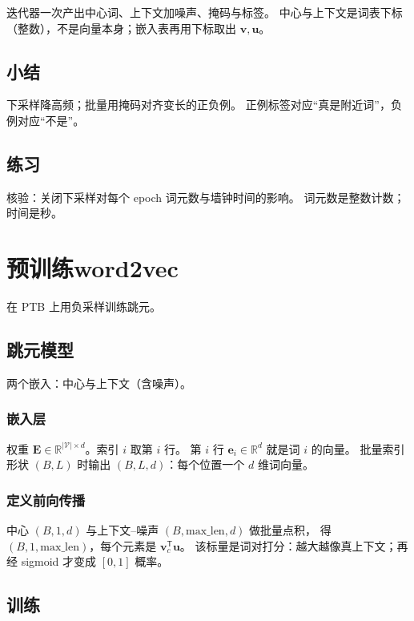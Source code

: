 迭代器一次产出中心词、上下文加噪声、掩码与标签。
中心与上下文是词表下标（整数），不是向量本身；嵌入表再用下标取出 $\bm{v},\bm{u}$。

\subsection{小结}

下采样降高频；批量用掩码对齐变长的正负例。
正例标签对应“真是附近词”，负例对应“不是”。

\subsection{练习}

核验：关闭下采样对每个 epoch 词元数与墙钟时间的影响。
词元数是整数计数；时间是秒。

\section{预训练word2vec}

在 PTB 上用负采样训练跳元。

\subsection{跳元模型}

两个嵌入：中心与上下文（含噪声）。

\subsubsection{嵌入层}

权重 $\bm{E}\in\mathbb{R}^{|\mathcal{V}|\times d}$。索引 $i$ 取第 $i$ 行。
第 $i$ 行 $\bm{e}_i\in\mathbb{R}^{d}$ 就是词 $i$ 的向量。
批量索引形状 $(B,L)$ 时输出 $(B,L,d)$：每个位置一个 $d$ 维词向量。

\subsubsection{定义前向传播}

中心 $(B,1,d)$ 与上下文–噪声 $(B,\mathrm{max\_len},d)$ 做批量点积，
得 $(B,1,\mathrm{max\_len})$，每个元素是 $\bm{v}_c^{\mathsf T}\bm{u}$。
该标量是词对打分：越大越像真上下文；再经 sigmoid 才变成 $[0,1]$ 概率。

\subsection{训练}

